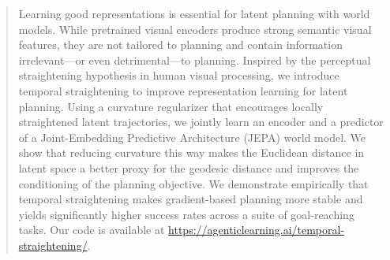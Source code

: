 \begin{abstract}
Learning good representations is essential for latent planning with world models. While pretrained visual encoders produce strong semantic visual features, they are not tailored to planning and contain information irrelevant---or even detrimental---to planning. Inspired by the perceptual straightening hypothesis in human visual processing, we introduce temporal straightening to improve representation learning for latent planning. Using a curvature regularizer that encourages locally straightened latent trajectories, we jointly learn an encoder and a predictor of a Joint-Embedding Predictive Architecture (JEPA) world model. We show that reducing curvature this way makes the Euclidean distance in latent space a better proxy for the geodesic distance and improves the conditioning of the planning objective. We demonstrate empirically that temporal straightening makes gradient-based planning more stable and yields significantly higher success rates across a suite of goal-reaching tasks. Our code is available at \url{https://agenticlearning.ai/temporal-straightening/}.
\end{abstract}